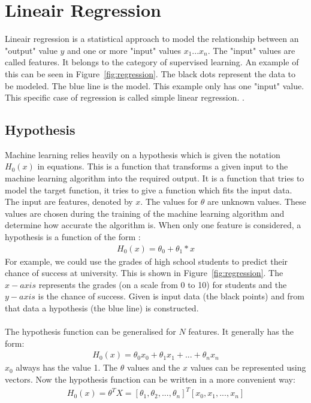 \section{Lineair Regression}
\label{regression}
Lineair regression is a statistical approach to model the relationship between an "output" value $y$ and one or more "input" values $x_1...x_n$. The "input" values are called features. It belongs to the category of supervised learning. An example of this can be seen in Figure~\ref{fig:regression}. The black dots represent the data to be modeled. The blue line is the model. This example only has one "input" value. This specific case of regression is called simple linear regression. \cite{scikit-regression}. 

\subsection{Hypothesis}
Machine learning relies heavily on a hypothesis which is given the notation $H_0(x)$ in equations. This is a function that transforms a given input to the machine learning algorithm into the required output. It is a function that tries to model the target function, it tries to give a function which fits the input data. The input are features, denoted by $x$.  The values for $\theta$ are unknown values. These values are chosen during the training of the machine learning algorithm and determine how accurate the algorithm is. When only one feature is considered, a hypothesis is a function of the form \cite{stanford}: 
\begin{align}
H_0(x) = \theta_0 + \theta_1 * x 
\end{align}
For example, we could use the grades of high school students to predict their chance of success at university. This is shown in Figure~\ref{fig:regression}. The $x-axis$ represents the grades (on a scale from 0 to 10) for students and the $y-axis$ is the chance of success. Given is input data (the black points) and from that data a hypothesis (the blue line) is constructed. \\\\
The hypothesis function can be generalised for $N$ features. It generally has the form:
\begin{align}
H_0(x) = \theta_0x_0 + \theta_1x_1 + ... + \theta_nx_n
\end{align}
$x_0$ always has the value 1. The $\theta$ values and the $x$ values can be represented using vectors. Now the hypothesis function can be written in a more convenient way:
\begin{align}
\label{hypothesisfunc}
H_0(x) = \theta^TX = [\theta_1, \theta_2, ..., \theta_n]^T [x_0, x_1, ..., x_n]
\end{align}

